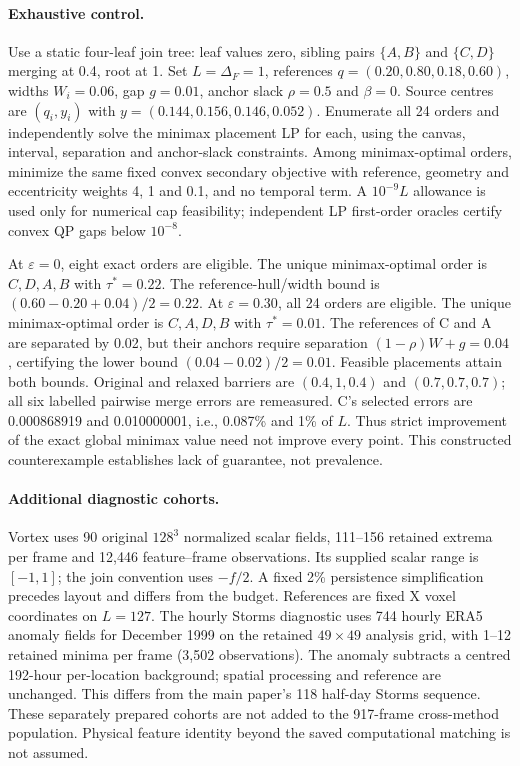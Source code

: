 \paragraph{Exhaustive control.} Use a static four-leaf join tree: leaf values zero, sibling pairs $\{A,B\}$ and $\{C,D\}$ merging at 0.4, root at 1. Set $L=\Delta_F=1$, references $q=(0.20,0.80,0.18,0.60)$, widths $W_i=0.06$, gap $g=0.01$, anchor slack $\rho=0.5$ and $\beta=0$. Source centres are $(q_i,y_i)$ with $y=(0.144,0.156,0.146,0.052)$. Enumerate all 24 orders and independently solve the minimax placement LP for each, using the canvas, interval, separation and anchor-slack constraints. Among minimax-optimal orders, minimize the same fixed convex secondary objective with reference, geometry and eccentricity weights 4, 1 and 0.1, and no temporal term. A $10^{-9}L$ allowance is used only for numerical cap feasibility; independent LP first-order oracles certify convex QP gaps below $10^{-8}$.

At $\varepsilon=0$, eight exact orders are eligible. The unique minimax-optimal order is $C,D,A,B$ with $\tau^*=0.22$. The reference-hull/width bound is $(0.60-0.20+0.04)/2=0.22$. At $\varepsilon=0.30$, all 24 orders are eligible. The unique minimax-optimal order is $C,A,D,B$ with $\tau^*=0.01$. The references of C and A are separated by 0.02, but their anchors require separation $(1-\rho)W+g=0.04$, certifying the lower bound $(0.04-0.02)/2=0.01$. Feasible placements attain both bounds. Original and relaxed barriers are $(0.4,1,0.4)$ and $(0.7,0.7,0.7)$; all six labelled pairwise merge errors are remeasured. C's selected errors are 0.000868919 and 0.010000001, i.e., 0.087\% and 1\% of $L$. Thus strict improvement of the exact global minimax value need not improve every point. This constructed counterexample establishes lack of guarantee, not prevalence.

\paragraph{Additional diagnostic cohorts.} Vortex uses 90 original $128^3$ normalized scalar fields, 111--156 retained extrema per frame and 12,446 feature--frame observations. Its supplied scalar range is $[-1,1]$; the join convention uses $-f/2$. A fixed 2\% persistence simplification precedes layout and differs from the budget. References are fixed X voxel coordinates on $L=127$. The hourly Storms diagnostic uses 744 hourly ERA5 anomaly fields for December 1999 on the retained $49\times49$ analysis grid, with 1--12 retained minima per frame (3,502 observations). The anomaly subtracts a centred 192-hour per-location background; spatial processing and reference are unchanged. This differs from the main paper's 118 half-day Storms sequence. These separately prepared cohorts are not added to the 917-frame cross-method population. Physical feature identity beyond the saved computational matching is not assumed.

